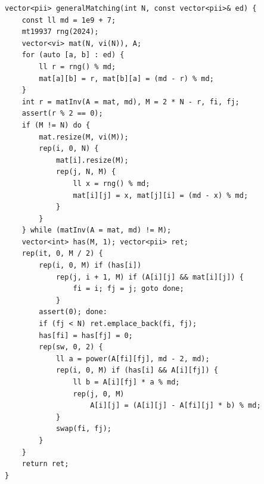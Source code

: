 \begin{lstlisting}
vector<pii> generalMatching(int N, const vector<pii>& ed) {
    const ll md = 1e9 + 7;
    mt19937 rng(2024);
    vector<vi> mat(N, vi(N)), A;
    for (auto [a, b] : ed) {
        ll r = rng() % md;
        mat[a][b] = r, mat[b][a] = (md - r) % md;
    }
    int r = matInv(A = mat, md), M = 2 * N - r, fi, fj;
    assert(r % 2 == 0);
    if (M != N) do {
        mat.resize(M, vi(M));
        rep(i, 0, N) {
            mat[i].resize(M);
            rep(j, N, M) {
                ll x = rng() % md;
                mat[i][j] = x, mat[j][i] = (md - x) % md;
            }
        }
    } while (matInv(A = mat, md) != M);
    vector<int> has(M, 1); vector<pii> ret;
    rep(it, 0, M / 2) {
        rep(i, 0, M) if (has[i])
            rep(j, i + 1, M) if (A[i][j] && mat[i][j]) {
                fi = i; fj = j; goto done;
            }
        assert(0); done:
        if (fj < N) ret.emplace_back(fi, fj);
        has[fi] = has[fj] = 0;
        rep(sw, 0, 2) {
            ll a = power(A[fi][fj], md - 2, md);
            rep(i, 0, M) if (has[i] && A[i][fj]) {
                ll b = A[i][fj] * a % md;
                rep(j, 0, M)
                    A[i][j] = (A[i][j] - A[fi][j] * b) % md;
            }
            swap(fi, fj);
        }
    }
    return ret;
}
\end{lstlisting}
